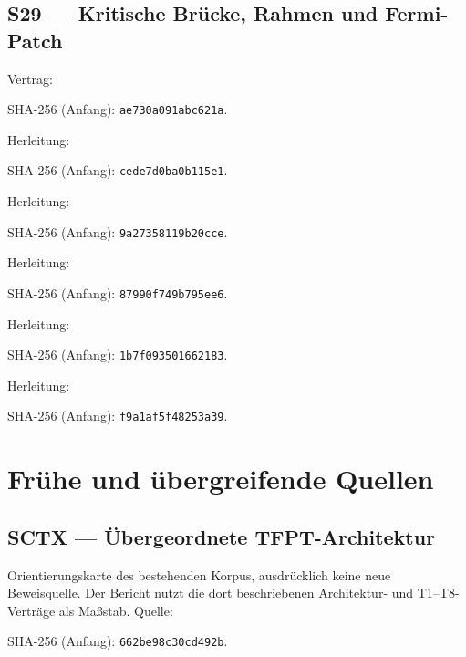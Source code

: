\subsection*{S29 — Kritische Brücke, Rahmen und Fermi-Patch}\label{s:29}
{\small{}\par}
Vertrag: \par{\footnotesize SHA-256 (Anfang): \texttt{ae730a091abc621a}.}\par
Herleitung: \par{\footnotesize SHA-256 (Anfang): \texttt{cede7d0ba0b115e1}.}\par
Herleitung: \par{\footnotesize SHA-256 (Anfang): \texttt{9a27358119b20cce}.}\par
Herleitung: \par{\footnotesize SHA-256 (Anfang): \texttt{87990f749b795ee6}.}\par
Herleitung: \par{\footnotesize SHA-256 (Anfang): \texttt{1b7f093501662183}.}\par
Herleitung: \par{\footnotesize SHA-256 (Anfang): \texttt{f9a1af5f48253a39}.}\par
\section{Frühe und übergreifende Quellen}
\subsection*{SCTX — Übergeordnete TFPT-Architektur}\label{s:CTX}
Orientierungskarte des bestehenden Korpus, ausdrücklich keine neue Beweisquelle. Der Bericht nutzt die dort beschriebenen Architektur- und T1--T8-Verträge als Maßstab.
Quelle: \par{\footnotesize SHA-256 (Anfang): \texttt{662be98c30cd492b}.}\par
